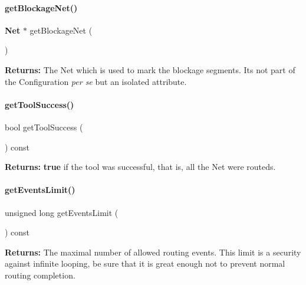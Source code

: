 \paragraph{\texorpdfstring{get\+Blockage\+Net()}{getBlockageNet()}}
{\footnotesize\ttfamily \textbf{ Net} $\ast$ get\+Blockage\+Net (\begin{DoxyParamCaption}{ }\end{DoxyParamCaption})\hspace{0.3cm}{\ttfamily [inline]}}

{\bfseries Returns\+:} The Net which is used to mark the blockage segments. It\textquotesingle{}s not part of the Configuration {\itshape per se} but an isolated attribute. \mbox{\label{classKite_1_1KiteEngine_ae88a4ccf0189655c785df38e5d75155c}} 
\paragraph{\texorpdfstring{get\+Tool\+Success()}{getToolSuccess()}}
{\footnotesize\ttfamily bool get\+Tool\+Success (\begin{DoxyParamCaption}{ }\end{DoxyParamCaption}) const\hspace{0.3cm}{\ttfamily [inline]}}

{\bfseries Returns\+:} {\bfseries true} if the tool was successful, that is, all the Net were routeds. \mbox{\label{classKite_1_1KiteEngine_abb19e465ef249651bfc0efbe6f23ef1d}} 
\paragraph{\texorpdfstring{get\+Events\+Limit()}{getEventsLimit()}}
{\footnotesize\ttfamily unsigned long get\+Events\+Limit (\begin{DoxyParamCaption}{ }\end{DoxyParamCaption}) const\hspace{0.3cm}{\ttfamily [inline]}}

{\bfseries Returns\+:} The maximal number of allowed routing events. This limit is a security against infinite looping, be sure that it is great enough not to prevent normal routing completion. \mbox{\label{classKite_1_1KiteEngine_aa9cc4f640a8b50dc1bcff8d938a09c3c}} 
